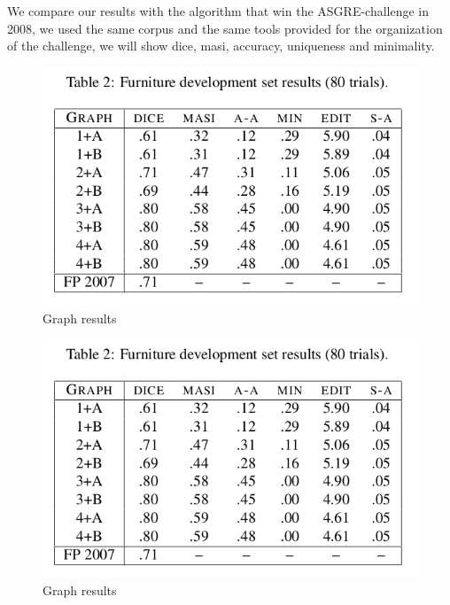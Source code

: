 
We compare our results with the algorithm that win the ASGRE-challenge in 2008, we used the same corpus and the same tools provided for the organization of the challenge, we will show dice, masi, accuracy, uniqueness and minimality. \cite{graph08}

\begin{figure}[h!]
\begin{center}
\includegraphics[width=.7\textwidth]{images/graphResults.jpg}
\end{center}
\vspace*{-2em}
\caption{Graph results \label{graphResults}}
\end{figure}

\begin{figure}[h!]
\begin{center}
\includegraphics[width=.7\textwidth]{images/graphResults.jpg}
\end{center}
\vspace*{-2em}
\caption{Graph results \label{graphResults2}}
\end{figure}

